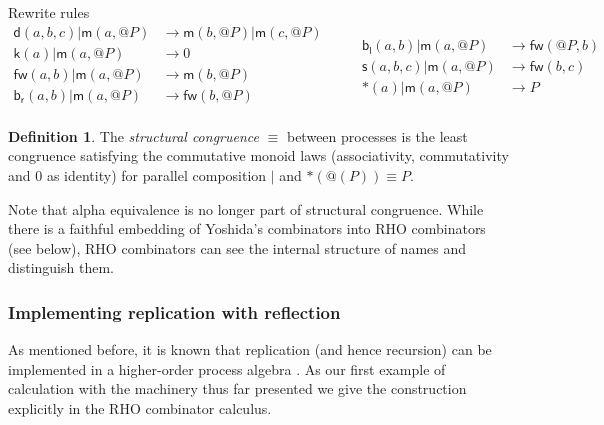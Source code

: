 \documentclass[submission,copyright,creativecommons]{eptcs}
\makeatletter
\newcommand{\pzero}{\mathbin{0}}
\newcommand{\scong}{\mathbin{\equiv}}
\newcommand{\quotep}[1]{\mathsf{@}#1}
\newcommand{\red}{\rightarrow}
\theoremstyle{definition}
\newtheorem{definition}{Definition}
\theoremstyle{remark}
\theoremstyle{remark}
\makeatother
\begin{document}
Rewrite rules
\[\begin{array}{rl}
\mathsf{d}(a,b,c) | \mathsf{m}(a,\quotep{P}) & \red \mathsf{m}(b,\quotep{P}) | \mathsf{m}(c,\quotep{P}) \\
\mathsf{k}(a) | \mathsf{m}(a,\quotep{P}) & \red 0 \\
\mathsf{fw}(a,b) | \mathsf{m}(a,\quotep{P}) & \red \mathsf{m}(b,\quotep{P}) \\
\mathsf{b}_{\mathsf{r}}(a,b) | \mathsf{m}(a,\quotep{P}) & \red \mathsf{fw}(b,\quotep{P}) \\  
\end{array} \quad \quad
\begin{array}{rl}
  \mathsf{b}_{\mathsf{l}}(a,b) | \mathsf{m}(a,\quotep{P}) & \red \mathsf{fw}(\quotep{P},b) \\
  \mathsf{s}(a,b,c) | \mathsf{m}(a,\quotep{P}) & \red \mathsf{fw}(b,c) \\
  *(a) | \mathsf{m}(a,\quotep{P}) & \red P
\end{array}\]

\begin{definition}
  The {\em structural congruence} $\equiv$
  between processes \cite{SangiorgiWalker} is the least congruence
  satisfying the commutative monoid laws
  (associativity, commutativity and $\pzero$ as identity) for parallel
  composition $|$ and $*(@(P)) \equiv P$.
\end{definition}

Note that alpha equivalence is no longer part of structural
congruence.  While there is a faithful embedding of Yoshida's
combinators into RHO combinators (see below), RHO combinators can see
the internal structure of names and distinguish them.

\subsubsection{Implementing replication with reflection}

% 
% 
% 
% 
% 
As mentioned before, it is known that replication (and hence
recursion) can be implemented in a higher-order process algebra
\cite{SangiorgiWalker}. As our first example of calculation with the
machinery thus far presented we give the construction explicitly in
the RHO combinator calculus.
\end{document}
